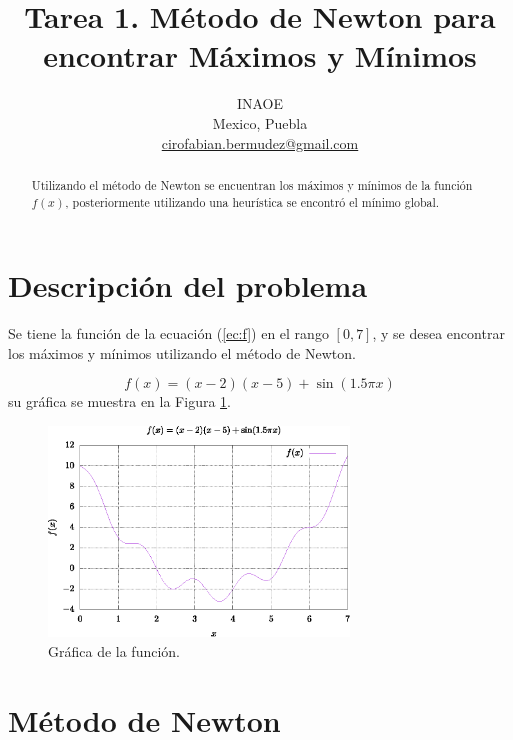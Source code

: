 \documentclass[conference]{IEEEtran}
\begin{document}
\title{Tarea 1. Método de Newton para encontrar Máximos y Mínimos \\
}

\author{
INAOE\\
Mexico, Puebla \\
\url{cirofabian.bermudez@gmail.com}
}

\maketitle

\begin{abstract}
Utilizando el método de Newton se encuentran los máximos y mínimos de la función $f(x)$, posteriormente utilizando una heurística se encontró el mínimo global.
\end{abstract}


\section{Descripción del problema}

Se tiene la función de la ecuación (\ref{ec:f}) en el rango $[0,7]$, y se desea encontrar los máximos y mínimos utilizando el método de Newton.

\begin{equation}
f(x) = (x-2)(x-5) + \sin(1.5 \pi x)
\label{ec:f}
\end{equation} 
su gráfica se muestra en la Figura \ref{fig:f}.

\begin{figure}[hbtp]
\centering
\includegraphics[width=8cm]{grafica1.eps} 
\caption{Gráfica de la función.}
\label{fig:f}
\end{figure}

\section{Método de Newton}
\end{document}
